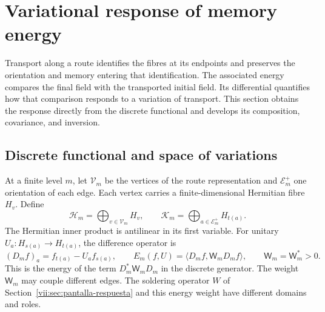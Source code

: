
\section{Variational response of memory energy}
\label{vii:sec:variacion-memoria}

Transport along a route identifies the fibres at its endpoints and preserves
the orientation and memory entering that identification. The associated energy
compares the final field with the transported initial field. Its
differential quantifies how that comparison responds to a variation of
transport. This section obtains the response directly from the discrete
functional and develops its composition, covariance, and inversion.

\subsection{Discrete functional and space of variations}
\label{vii:subsec:funcional-memoria}

At a finite level \(m\), let \(\mathcal V_m\) be the vertices of the
route representation and \(\mathcal E_m^+\) one orientation of each edge.
Each vertex carries a finite-dimensional Hermitian fibre \(H_v\).
Define
\[
 \mathcal H_m=\bigoplus_{v\in\mathcal V_m}H_v,\qquad
 \mathcal K_m=\bigoplus_{a\in\mathcal E_m^+}H_{t(a)}.
\]
The Hermitian inner product is antilinear in its first variable.
For unitary \(U_a:H_{s(a)}\to H_{t(a)}\), the difference operator is
\begin{equation}
 (D_mf)_a=f_{t(a)}-U_af_{s(a)},\qquad
 E_m(f,U)=\langle D_mf,\mathsf W_mD_mf\rangle,\qquad
 \mathsf W_m=\mathsf W_m^*>0.
 \label{vii:eq:energia-memoria-discreta}
\end{equation}
This is the energy of the term \(D_m^*\mathsf W_mD_m\) in the discrete generator.
The weight \(\mathsf W_m\) may couple different edges. The soldering
operator \(W\) of Section~\ref{vii:sec:pantalla-respuesta} and this
energy weight have different domains and roles.

